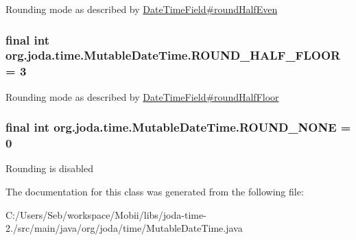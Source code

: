 Rounding mode as described by \hyperlink{classorg_1_1joda_1_1time_1_1_date_time_field_a5ab46df274cb4b306d66a1f727187843}{Date\-Time\-Field\#round\-Half\-Even} \hypertarget{classorg_1_1joda_1_1time_1_1_mutable_date_time_a45db276a63391b0ec3d6a20e75ed2d3c}{
\subsubsection[{R\-O\-U\-N\-D\-\_\-\-H\-A\-L\-F\-\_\-\-F\-L\-O\-O\-R}]{\setlength{\rightskip}{0pt plus 5cm}final int org.\-joda.\-time.\-Mutable\-Date\-Time.\-R\-O\-U\-N\-D\-\_\-\-H\-A\-L\-F\-\_\-\-F\-L\-O\-O\-R = 3\hspace{0.3cm}{\ttfamily [static]}}}\label{classorg_1_1joda_1_1time_1_1_mutable_date_time_a45db276a63391b0ec3d6a20e75ed2d3c}
Rounding mode as described by \hyperlink{classorg_1_1joda_1_1time_1_1_date_time_field_a88fc9e6af1ab6c27f11046e382b3f398}{Date\-Time\-Field\#round\-Half\-Floor} \hypertarget{classorg_1_1joda_1_1time_1_1_mutable_date_time_a39179457a6e84290d7985378db4ec225}{
\subsubsection[{R\-O\-U\-N\-D\-\_\-\-N\-O\-N\-E}]{\setlength{\rightskip}{0pt plus 5cm}final int org.\-joda.\-time.\-Mutable\-Date\-Time.\-R\-O\-U\-N\-D\-\_\-\-N\-O\-N\-E = 0\hspace{0.3cm}{\ttfamily [static]}}}\label{classorg_1_1joda_1_1time_1_1_mutable_date_time_a39179457a6e84290d7985378db4ec225}
Rounding is disabled 

The documentation for this class was generated from the following file\-:\begin{DoxyCompactItemize}
\item 
C\-:/\-Users/\-Seb/workspace/\-Mobii/libs/joda-\/time-\/2./src/main/java/org/joda/time/Mutable\-Date\-Time.\-java\end{DoxyCompactItemize}
